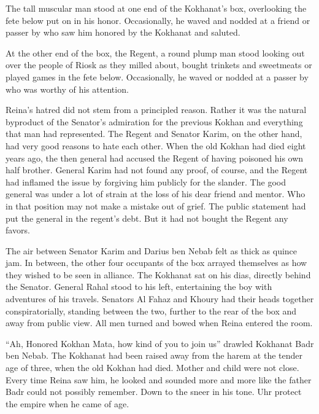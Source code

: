 \documentclass{article}
\begin{document}
	The tall muscular man stood at one end of the Kokhanat’s box, overlooking the fete below put on in his honor. Occasionally, he waved and nodded at a friend or passer by who saw him honored by the Kokhanat and saluted. 
	
	At the other end of the box, the Regent, a round plump man stood looking out over the people of Riosk as they milled about, bought trinkets and sweetmeats or played games in the fete below. Occasionally, he waved or nodded at a passer by who was worthy of his attention. 
	
	Reina’s hatred did not stem from a principled reason. Rather it was the natural byproduct of the Senator’s admiration for the previous Kokhan and everything that man had represented. The Regent and Senator Karim, on the other hand, had very good reasons to hate each other. When the old Kokhan had died eight years ago, the then general had accused the Regent of having poisoned his own half brother. General Karim had not found any proof, of course, and the Regent had inflamed the issue by forgiving him publicly for the slander. The good general was under a lot of strain at the loss of his dear friend and mentor. Who in that position may not make a mistake out of grief. The public statement had put the general in the regent’s debt. But it had not bought the Regent any favors.
	
	The air between Senator Karim and Darius ben Nebab felt as thick as quince jam. In between, the other four occupants of the box arrayed themselves as how they wished to be seen in alliance. The Kokhanat sat on his dias, directly behind the Senator. General Rahal stood to his left, entertaining the boy with adventures of his travels. Senators Al Fahaz and Khoury had their heads together conspiratorially, standing between the two, further to the rear of the box and away from public view. All men turned and bowed when Reina entered the room. 
	
	“Ah, Honored Kokhan Mata, how kind of you to join us” drawled Kokhanat Badr ben Nebab. The Kokhanat had been raised away from the harem at the tender age of three, when the old Kokhan had died. Mother and child were not close. Every time Reina saw him, he looked and sounded more and more like the father Badr could not possibly remember. Down to the sneer in his tone. Uhr protect the empire when he came of age.
	
\end{document}
